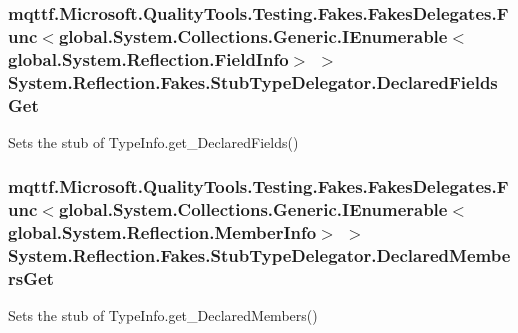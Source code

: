 \hypertarget{class_system_1_1_reflection_1_1_fakes_1_1_stub_type_delegator_a393b12b4064d45d6a6be2f79414e6026}{
\subsubsection[{Declared\-Fields\-Get}]{\setlength{\rightskip}{0pt plus 5cm}mqttf.\-Microsoft.\-Quality\-Tools.\-Testing.\-Fakes.\-Fakes\-Delegates.\-Func$<$global.\-System.\-Collections.\-Generic.\-I\-Enumerable$<$global.\-System.\-Reflection.\-Field\-Info$>$ $>$ System.\-Reflection.\-Fakes.\-Stub\-Type\-Delegator.\-Declared\-Fields\-Get}}\label{class_system_1_1_reflection_1_1_fakes_1_1_stub_type_delegator_a393b12b4064d45d6a6be2f79414e6026}


Sets the stub of Type\-Info.\-get\-\_\-\-Declared\-Fields()

\hypertarget{class_system_1_1_reflection_1_1_fakes_1_1_stub_type_delegator_a34e8c000c09968ca25525207fdf92140}{
\subsubsection[{Declared\-Members\-Get}]{\setlength{\rightskip}{0pt plus 5cm}mqttf.\-Microsoft.\-Quality\-Tools.\-Testing.\-Fakes.\-Fakes\-Delegates.\-Func$<$global.\-System.\-Collections.\-Generic.\-I\-Enumerable$<$global.\-System.\-Reflection.\-Member\-Info$>$ $>$ System.\-Reflection.\-Fakes.\-Stub\-Type\-Delegator.\-Declared\-Members\-Get}}\label{class_system_1_1_reflection_1_1_fakes_1_1_stub_type_delegator_a34e8c000c09968ca25525207fdf92140}


Sets the stub of Type\-Info.\-get\-\_\-\-Declared\-Members()

